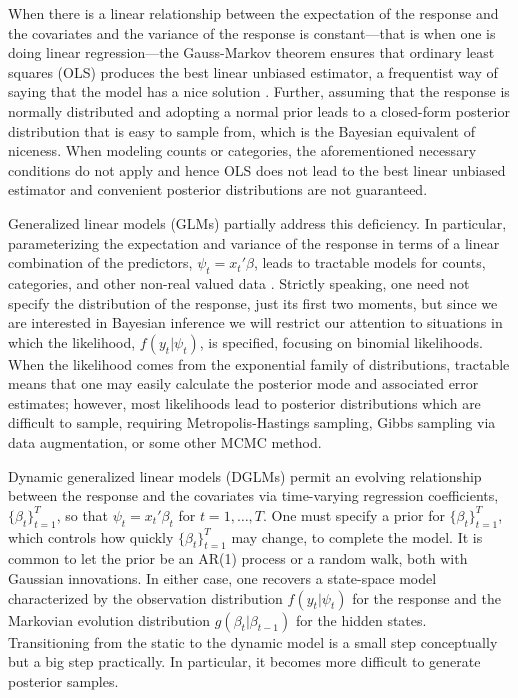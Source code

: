 \documentclass[12pt]{article}
\begin{document}
When there is a linear relationship between the expectation of the response and
the covariates and the variance of the response is constant---that is when one
is doing linear regression---the Gauss-Markov theorem ensures that ordinary
least squares (OLS) produces the best linear unbiased estimator, a frequentist
way of saying that the model has a nice solution \citep{christensen-book-2001}.
Further, assuming that the response is normally distributed and adopting a
normal prior leads to a closed-form posterior distribution that is easy to
sample from, which is the Bayesian equivalent of niceness.  When modeling counts
or categories, the aforementioned necessary conditions do not apply and hence
OLS does not lead to the best linear unbiased estimator and convenient posterior
distributions are not guaranteed.

Generalized linear models (GLMs) partially address this deficiency.  In
particular, parameterizing the expectation and variance of the response in terms
of a linear combination of the predictors, $\psi_t = x_t' \beta$, leads to
tractable models for counts, categories, and other non-real valued data
\citep{mccullagh-nelder-1989, wedderburn-1974}.  Strictly speaking, one need not
specify the distribution of the response, just its first two moments, but since
we are interested in Bayesian inference we will restrict our attention to
situations in which the likelihood, $f(y_t | \psi_t)$, is specified, focusing on
binomial likelihoods.  When the likelihood comes from the exponential family of
distributions, tractable means that one may easily calculate the posterior mode
and associated error estimates; however, most likelihoods lead to posterior
distributions which are difficult to sample, requiring Metropolis-Hastings
sampling, Gibbs sampling via data augmentation, or some other MCMC method.

Dynamic generalized linear models (DGLMs) permit an evolving relationship
between the response and the covariates via time-varying regression
coefficients, $\{\beta_t\}_{t=1}^T$, so that $\psi_t = x_t' \beta_t$ for $t=1,
\ldots, T$.  One must specify a prior for $\{\beta_t\}_{t=1}^T$, which controls
how quickly $\{\beta_t\}_{t=1}^T$ may change, to complete the model.  It is
common to let the prior be an AR(1) process or a random walk, both with Gaussian
innovations.  In either case, one recovers a state-space model characterized by
the observation distribution $f(y_t | \psi_t)$ for the response and the
Markovian evolution distribution $g(\beta_t | \beta_{t-1})$ for the hidden
states.  Transitioning from the static to the dynamic model is a small step
conceptually but a big step practically.  In particular, it becomes more
difficult to generate posterior samples.
\end{document}
